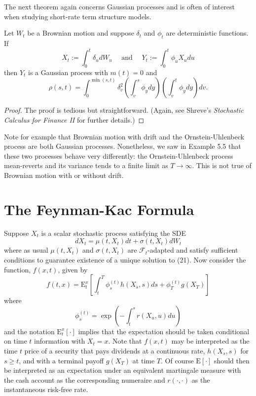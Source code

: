 The next theorem again concerns Gaussian processes and is often of interest when studying short-rate term structure models.

\begin{theorem}
Let $W_t$ be a Brownian motion and suppose $\delta_t$ and $\phi_t$ are deterministic functions. If
\[X_t := \int_0^t \delta_u dW_u \quad \text{ and } \quad Y_t := \int_0^t \phi_u X_u du\]
then $Y_t$ is a Gaussian process with $m(t)=0$ and
\[\rho(s,t) = \int_0^{\min(s,t)} \delta_v^2 \left(\int_v^s \phi_y dy\right) \left(\int_v^t \phi_y dy\right) dv.\]
\end{theorem}

\begin{proof}
The proof is tedious but straightforward. (Again, see Shreve's \textit{Stochastic Calculus for Finance II} for further details.)
\end{proof}

Note for example that Brownian motion with drift and the Ornstein-Uhlenbeck process are both Gaussian processes. Nonetheless, we saw in Example 5.5 that these two processes behave very differently: the Ornstein-Uhlenbeck process mean-reverts and its variance tends to a finite limit as $T\to\infty$. This is not true of Brownian motion with or without drift.

\section{The Feynman-Kac Formula}
Suppose $X_t$ is a scalar stochastic process satisfying the SDE
\[dX_t = \mu(t,X_t) dt + \sigma(t,X_t) dW_t \tag{21}\]
where as usual $\mu(t,X_t)$ and $\sigma(t,X_t)$ are $\mathcal{F}_t$-adapted and satisfy sufficient conditions to guarantee existence of a unique solution to (21). Now consider the function, $f(x,t)$, given by
\[f(t,x) = \mathrm{E}_t^x\left[\int_t^T \phi_s^{(t)} h(X_s,s) ds + \phi_T^{(t)} g(X_T)\right]\]
where
\[\phi_s^{(t)} = \exp\left(-\int_t^s r(X_u,u) du\right)\]
and the notation $\mathrm{E}_t^x[\cdot]$ implies that the expectation should be taken conditional on time $t$ information with $X_t=x$. Note that $f(x,t)$ may be interpreted as the time $t$ price of a security that pays dividends at a continuous rate, $h(X_s,s)$ for $s\geq t$, and with a terminal payoff $g(X_T)$ at time $T$. Of course $\mathrm{E}[\cdot]$ should then be interpreted as an expectation under an equivalent martingale measure with the cash account as the corresponding numeraire and $r(\cdot,\cdot)$ as the instantaneous risk-free rate.

